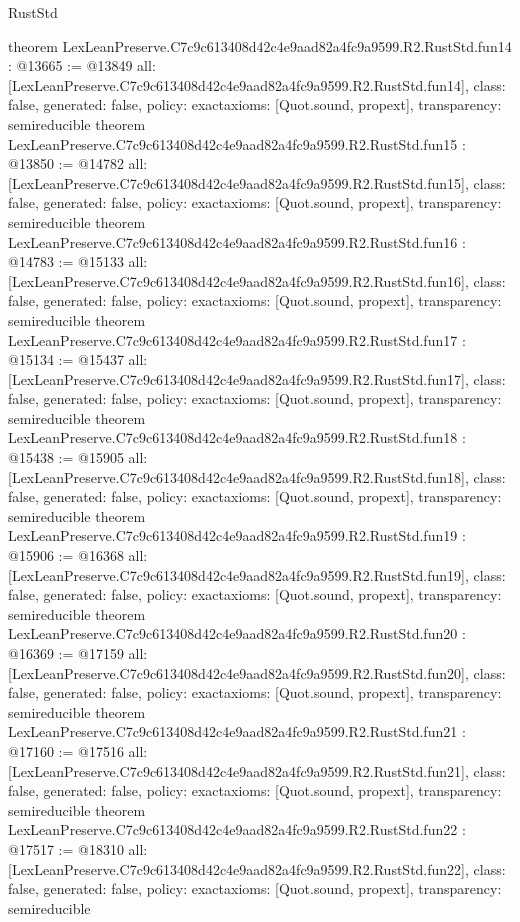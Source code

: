 \begin{lexlean}{RustStd}
\begin{coremodule}
{}
theorem LexLeanPreserve.C7c9c613408d42c4e9aad82a4fc9a9599.R2.RustStd.fun14 : @13665 := @13849 {
  all: [LexLeanPreserve.C7c9c613408d42c4e9aad82a4fc9a9599.R2.RustStd.fun14],
  class: false,
  generated: false,
  policy: exact{axioms: [Quot.sound, propext]},
  transparency: semireducible
}
theorem LexLeanPreserve.C7c9c613408d42c4e9aad82a4fc9a9599.R2.RustStd.fun15 : @13850 := @14782 {
  all: [LexLeanPreserve.C7c9c613408d42c4e9aad82a4fc9a9599.R2.RustStd.fun15],
  class: false,
  generated: false,
  policy: exact{axioms: [Quot.sound, propext]},
  transparency: semireducible
}
theorem LexLeanPreserve.C7c9c613408d42c4e9aad82a4fc9a9599.R2.RustStd.fun16 : @14783 := @15133 {
  all: [LexLeanPreserve.C7c9c613408d42c4e9aad82a4fc9a9599.R2.RustStd.fun16],
  class: false,
  generated: false,
  policy: exact{axioms: [Quot.sound, propext]},
  transparency: semireducible
}
theorem LexLeanPreserve.C7c9c613408d42c4e9aad82a4fc9a9599.R2.RustStd.fun17 : @15134 := @15437 {
  all: [LexLeanPreserve.C7c9c613408d42c4e9aad82a4fc9a9599.R2.RustStd.fun17],
  class: false,
  generated: false,
  policy: exact{axioms: [Quot.sound, propext]},
  transparency: semireducible
}
theorem LexLeanPreserve.C7c9c613408d42c4e9aad82a4fc9a9599.R2.RustStd.fun18 : @15438 := @15905 {
  all: [LexLeanPreserve.C7c9c613408d42c4e9aad82a4fc9a9599.R2.RustStd.fun18],
  class: false,
  generated: false,
  policy: exact{axioms: [Quot.sound, propext]},
  transparency: semireducible
}
theorem LexLeanPreserve.C7c9c613408d42c4e9aad82a4fc9a9599.R2.RustStd.fun19 : @15906 := @16368 {
  all: [LexLeanPreserve.C7c9c613408d42c4e9aad82a4fc9a9599.R2.RustStd.fun19],
  class: false,
  generated: false,
  policy: exact{axioms: [Quot.sound, propext]},
  transparency: semireducible
}
theorem LexLeanPreserve.C7c9c613408d42c4e9aad82a4fc9a9599.R2.RustStd.fun20 : @16369 := @17159 {
  all: [LexLeanPreserve.C7c9c613408d42c4e9aad82a4fc9a9599.R2.RustStd.fun20],
  class: false,
  generated: false,
  policy: exact{axioms: [Quot.sound, propext]},
  transparency: semireducible
}
theorem LexLeanPreserve.C7c9c613408d42c4e9aad82a4fc9a9599.R2.RustStd.fun21 : @17160 := @17516 {
  all: [LexLeanPreserve.C7c9c613408d42c4e9aad82a4fc9a9599.R2.RustStd.fun21],
  class: false,
  generated: false,
  policy: exact{axioms: [Quot.sound, propext]},
  transparency: semireducible
}
theorem LexLeanPreserve.C7c9c613408d42c4e9aad82a4fc9a9599.R2.RustStd.fun22 : @17517 := @18310 {
  all: [LexLeanPreserve.C7c9c613408d42c4e9aad82a4fc9a9599.R2.RustStd.fun22],
  class: false,
  generated: false,
  policy: exact{axioms: [Quot.sound, propext]},
  transparency: semireducible
}
\end{coremodule}
\end{lexlean}

